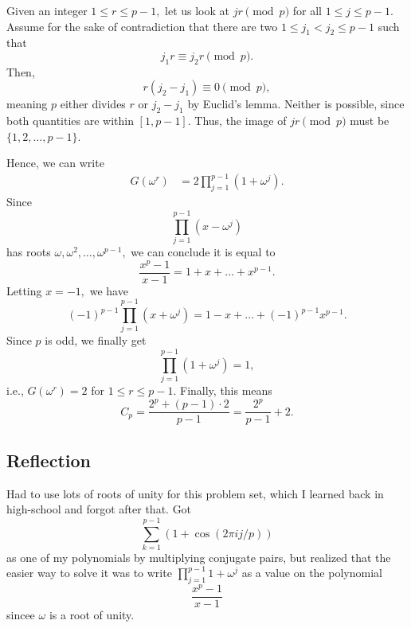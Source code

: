 \documentclass[12pt]{article}
\begin{document}
\begin{enumerate}
    Given an integer $1 \leq r \leq p-1,$ let us look at $jr \pmod p$
    for all $1 \leq j \leq p - 1.$ Assume for the sake of
    contradiction that there are two $1 \leq j_1 <  j_2 \leq p - 1$ such that
    $$
    j_1r \equiv  j_2 r \pmod p.
    $$
    Then,
    $$
    r(j_2 - j_1) \equiv  0 \pmod p,
    $$
    meaning $p$ either divides $r$ or $j_2 - j_1$ by Euclid's lemma.
    Neither is possible, since both quantities are within $[1, p -
    1].$ Thus, the image of $jr \pmod p$ must be $\{1, 2, \ldots, p - 1\}.$

    Hence, we can write
    \begin{align*}
      G(\omega^r) &= 2 \prod_{j = 1}^{p-1} (1 + \omega^{j}).
    \end{align*}
    Since
    $$
    \prod_{j = 1}^{p-1} (x-\omega^j)
    $$
    has roots $\omega, \omega^2, \ldots, \omega^{p-1},$ we can
    conclude it is equal to
    $$
    \dfrac{x^p - 1}{x- 1} = 1 + x + \ldots + x^{p-1}.
    $$
    Letting $x = -1,$ we have
    $$
    (-1)^{p-1}\prod_{j = 1}^{p-1}(x + \omega^j) = 1 -  x + \ldots +
    (-1)^{p-1}x^{p-1}.
    $$
    Since $p$ is odd, we finally get
    $$
    \prod_{j = 1}^{p-1}(1 + \omega^j) = 1,
    $$
    i.e., $G(\omega^r) = 2$ for $1 \leq r \leq p -1.$ Finally, this means
    $$
    C_p = \dfrac{2^p + (p-1) \cdot 2  }{p-1} = \dfrac{2^p}{p-1} + 2.
    $$
\end{enumerate}

\subsection{Reflection}
Had to use lots of roots of unity for this problem set, which I
learned back in high-school and forgot after that. Got
$$
\sum_{k = 1}^{p - 1} (1 + \cos(2\pi i j/p))
$$
as one of my polynomials by multiplying conjugate pairs, but realized
that the easier way to solve it was to write $\prod_{j =1}^{p-1} 1 +
\omega^j$ as a value on the polynomial
$$
\dfrac{x^p - 1}{x-1}
$$
sincee $\omega$ is a root of unity.
\end{document}
